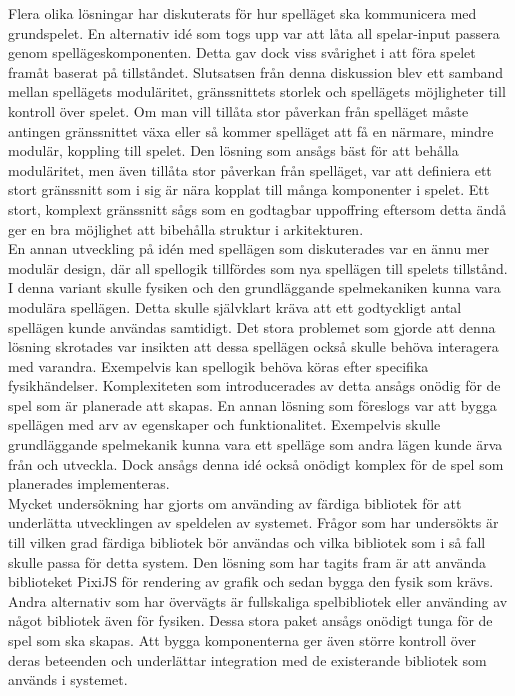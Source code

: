 Flera olika lösningar har diskuterats för hur spelläget ska kommunicera med grundspelet. En alternativ idé som togs upp var att låta all spelar-input passera genom spellägeskomponenten. Detta gav dock viss svårighet i att föra spelet framåt baserat på tillståndet. Slutsatsen från denna diskussion blev ett samband mellan spellägets moduläritet, gränssnittets storlek och spellägets möjligheter till kontroll över spelet. Om man vill tillåta stor påverkan från spelläget måste antingen gränssnittet växa eller så kommer spelläget att få en närmare, mindre modulär, koppling till spelet. Den lösning som ansågs bäst för att behålla moduläritet, men även tillåta stor påverkan från spelläget, var att definiera ett stort gränssnitt som i sig är nära kopplat till många komponenter i spelet. Ett stort, komplext gränssnitt sågs som en godtagbar uppoffring eftersom detta ändå ger en bra möjlighet att bibehålla struktur i arkitekturen.\\

En annan utveckling på idén med spellägen som diskuterades var en ännu mer modulär design, där all spellogik tillfördes som nya spellägen till spelets tillstånd. I denna variant skulle fysiken och den grundläggande spelmekaniken kunna vara modulära spellägen. Detta skulle självklart kräva att ett godtyckligt antal spellägen kunde användas samtidigt. Det stora problemet som gjorde att denna lösning skrotades var insikten att dessa spellägen också skulle behöva interagera med varandra. Exempelvis kan spellogik behöva köras efter specifika fysikhändelser. Komplexiteten som introducerades av detta ansågs onödig för de spel som är planerade att skapas. En annan lösning som föreslogs var att bygga spellägen med arv av egenskaper och funktionalitet. Exempelvis skulle grundläggande spelmekanik kunna vara ett spelläge som andra lägen kunde ärva från och utveckla. Dock ansågs denna idé också onödigt komplex för de spel som planerades implementeras.\\

Mycket undersökning har gjorts om använding av färdiga bibliotek för att underlätta utvecklingen av speldelen av systemet. Frågor som har undersökts är till vilken grad färdiga bibliotek bör användas och vilka bibliotek som i så fall skulle passa för detta system. Den lösning som har tagits fram är att använda biblioteket PixiJS\cite{bib-pixi} för rendering av grafik och sedan bygga den fysik som krävs. Andra alternativ som har övervägts är fullskaliga spelbibliotek eller använding av något bibliotek även för fysiken. Dessa stora paket ansågs onödigt tunga för de spel som ska skapas. Att bygga komponenterna ger även större kontroll över deras beteenden och underlättar integration med de existerande bibliotek som används i systemet.\\
